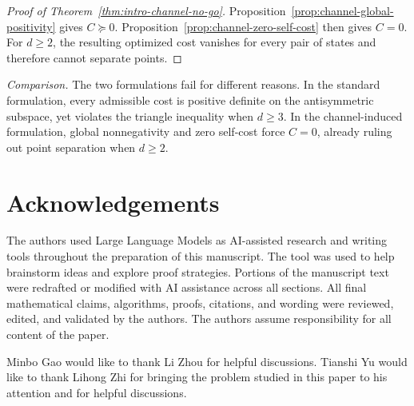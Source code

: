\documentclass[11pt]{article}
\begin{document}
\begin{proof}[Proof of Theorem~\ref{thm:intro-channel-no-go}]
    Proposition~\ref{prop:channel-global-positivity} gives $C\succeq0$.
    Proposition~\ref{prop:channel-zero-self-cost} then gives $C=0$.  For
    $d\geq2$, the resulting optimized cost vanishes for every pair of states
    and therefore cannot separate points.
\end{proof}

\noindent\emph{Comparison.}
The two formulations fail for different reasons.  In the standard
formulation, every admissible cost is positive definite on the antisymmetric
subspace, yet violates the triangle inequality when $d\geq3$.  In the
channel-induced formulation, global nonnegativity and zero self-cost force
$C=0$, already ruling out point separation when $d\geq2$.

\section*{Acknowledgements}
The authors used Large Language Models as AI-assisted research and writing tools throughout the
preparation of this manuscript. The tool was used to help brainstorm ideas and explore proof
strategies. Portions of the manuscript text were redrafted or modified with AI assistance across all
sections. All final mathematical claims, algorithms, proofs, citations, and wording were reviewed,
edited, and validated by the authors. The authors assume responsibility for all content of the
paper.

Minbo Gao would like to thank Li Zhou for helpful discussions. Tianshi Yu would like to thank Lihong Zhi for bringing the problem studied in this paper to his attention and for helpful discussions.

{\small


}
\end{document}
